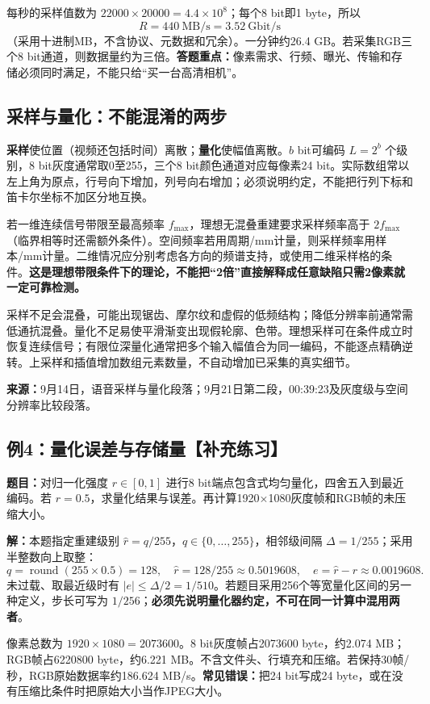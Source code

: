 每秒的采样值数为 $22000\times20000=4.4\times10^8$；每个8 bit即1 byte，所以
\[
R=440\ \mathrm{MB/s}=3.52\ \mathrm{Gbit/s}
\]
（采用十进制MB，不含协议、元数据和冗余）。一分钟约26.4 GB。若采集RGB三个8 bit通道，则数据量约为三倍。\textbf{答题重点：}像素需求、行频、曝光、传输和存储必须同时满足，不能只给“买一台高清相机”。

\subsection{采样与量化：不能混淆的两步}
\textbf{采样}使位置（视频还包括时间）离散；\textbf{量化}使幅值离散。$b$ bit可编码 $L=2^b$ 个级别，8 bit灰度通常取0至255，三个8 bit颜色通道对应每像素24 bit。实际数组常以左上角为原点，行号向下增加，列号向右增加；必须说明约定，不能把行列下标和笛卡尔坐标不加区分地互换。

若一维连续信号带限至最高频率 $f_{\max}$，理想无混叠重建要求采样频率高于 $2f_{\max}$（临界相等时还需额外条件）。空间频率若用周期/mm计量，则采样频率用样本/mm计量。二维情况应分别考虑各方向的频谱支持，或使用二维采样格的条件。\textbf{这是理想带限条件下的理论，不能把“2倍”直接解释成任意缺陷只需2像素就一定可靠检测。}

采样不足会混叠，可能出现锯齿、摩尔纹和虚假的低频结构；降低分辨率前通常需低通抗混叠。量化不足易使平滑渐变出现假轮廓、色带。理想采样可在条件成立时恢复连续信号；有限位深量化通常把多个输入幅值合为同一编码，不能逐点精确逆转。上采样和插值增加数组元素数量，不自动增加已采集的真实细节。

\noindent\textbf{来源：}9月14日，语音采样与量化段落；9月21日第二段，00:39:23及灰度级与空间分辨率比较段落。

\subsection{例4：量化误差与存储量【补充练习】}
\textbf{题目：}对归一化强度 $r\in[0,1]$ 进行8 bit端点包含式均匀量化，四舍五入到最近编码。若 $r=0.5$，求量化结果与误差。再计算1920$\times$1080灰度帧和RGB帧的未压缩大小。

\textbf{解：}本题指定重建级别 $\hat r=q/255$，$q\in\{0,\ldots,255\}$，相邻级间隔 $\Delta=1/255$；采用半整数向上取整：
\[
q=\operatorname{round}(255\times0.5)=128,
\quad\hat r=128/255\approx0.5019608,
\quad e=\hat r-r\approx0.0019608.
\]
未过载、取最近级时有 $|e|\leq\Delta/2=1/510$。若题目采用256个等宽量化区间的另一种定义，步长可写为 $1/256$；\textbf{必须先说明量化器约定，不可在同一计算中混用两者}。

像素总数为 $1920\times1080=2073600$。8 bit灰度帧占2073600 byte，约2.074 MB；RGB帧占6220800 byte，约6.221 MB。不含文件头、行填充和压缩。若保持30帧/秒，RGB原始数据率约186.624 MB/s。\textbf{常见错误：}把24 bit写成24 byte，或在没有压缩比条件时把原始大小当作JPEG大小。

